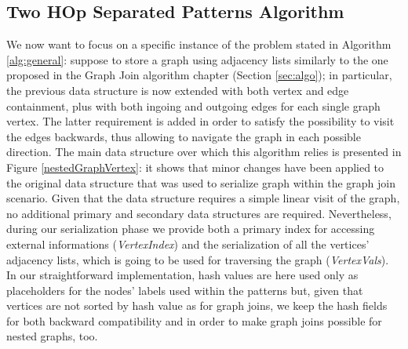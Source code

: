 \subsection{Two HOp Separated Patterns Algorithm}\label{sec:THOSPA}
We now want to focus on a specific instance of the problem stated in Algorithm \ref{alg:general}: suppose to store a graph using adjacency lists similarly to the one proposed in the Graph Join algorithm chapter (Section \vref{sec:algo}); in particular, the previous data structure is now extended with both vertex and edge containment, plus with both ingoing and outgoing edges for each single graph vertex. The latter requirement is added in order to satisfy the possibility to visit the edges backwards, thus allowing to navigate the graph in each possible direction. The main data structure over which this algorithm relies  is presented in Figure \vref{nestedGraphVertex}: it shows that minor changes have been applied to the original data structure that was used to serialize graph within the graph join scenario. %
Given that the data structure requires a simple linear visit of the graph, no additional primary and secondary data structures are required. Nevertheless, during our serialization phase we provide both a primary index for accessing external informations (\textit{VertexIndex}) and the serialization of all the vertices' adjacency lists, which is going to be used for traversing the graph (\textit{VertexVals}). In our straightforward implementation, hash values are here used only as placeholders for the nodes' labels used within the patterns but, given that vertices are not sorted by hash value as for graph joins, we keep the hash fields for both backward compatibility and in order to make graph joins possible for nested graphs, too.


